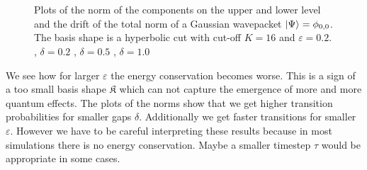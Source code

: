 \begin{figure}
{  } \\
   \\
  \caption[Plots of the norms and drifts for a simple avoided crossing]{
    Plots of the norm of the components on the upper and lower level and the drift of the total norm
    of a Gaussian wavepacket $\Ket{\Psi} = \phi_{0,0}$. The basis shape is a hyperbolic cut with cut-off $K = 16$
    and $\varepsilon = 0.2$.
    ,  $\delta = 0.2$
    ,  $\delta = 0.5$
    ,  $\delta = 1.0$
    \label{fig:deltagap_rotsym_16_norms_eps_02_part2}
  }
\end{figure}

We see how for larger $\varepsilon$ the energy conservation becomes worse. This is
a sign of a too small basis shape $\mathfrak{K}$ which can not capture the
emergence of more and more quantum effects. The plots of the norms show that we get
higher transition probabilities for smaller gaps $\delta$. Additionally we get faster
transitions for smaller $\varepsilon$. However we have to be careful interpreting
these results because in most simulations there is no energy conservation. Maybe
a smaller timestep $\tau$ would be appropriate in some cases.


